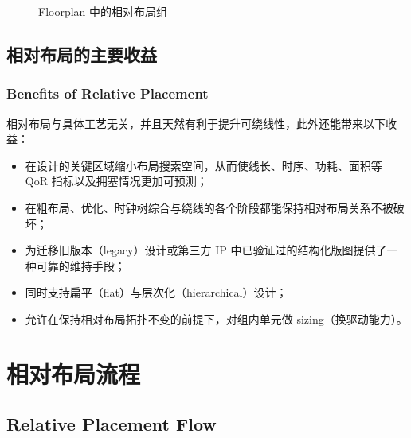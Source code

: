 \begin{figure}[htbp]
\centering
{}
\caption{Floorplan 中的相对布局组}
\label{fig:rp-floorplan}
\end{figure}

\subsection{相对布局的主要收益}
\subsubsection*{Benefits of Relative Placement}

相对布局与具体工艺无关，并且天然有利于提升可绕线性，此外还能带来以下收益：
\begin{itemize}
  \item 在设计的关键区域缩小布局搜索空间，从而使线长、时序、功耗、面积等 QoR 指标以及拥塞情况更加可预测；
  \item 在粗布局、优化、时钟树综合与绕线的各个阶段都能保持相对布局关系不被破坏；
  \item 为迁移旧版本（legacy）设计或第三方 IP 中已验证过的结构化版图提供了一种可靠的维持手段；
  \item 同时支持扁平（flat）与层次化（hierarchical）设计；
  \item 允许在保持相对布局拓扑不变的前提下，对组内单元做 sizing（换驱动能力）。
\end{itemize}

\section{相对布局流程}
\subsection*{Relative Placement Flow}

